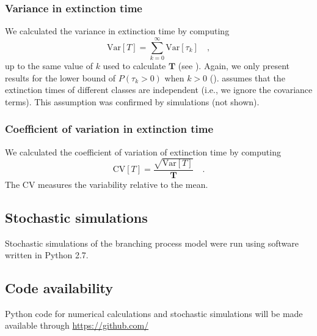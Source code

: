 \documentclass[9pt,lineno]{elife}
\begin{document}
\subsubsection{Variance in extinction time}

We calculated the variance in extinction time by computing 
%
\begin{equation}
    \mathrm{Var}[T] = \sum_{k=0}^\infty \mathrm{Var}[\tau_k] \quad ,
    \label{eq:varT}
\end{equation}
%
up to the same value of $k$ used to calculate $\mathbf{T}$ (see ).  
Again, we only present results for the lower bound of $P(\tau_{k} > 0)$ when $k>0$ ().
 assumes that the extinction times of different classes are independent (i.e., we ignore the covariance terms).  
This assumption was confirmed by simulations (not shown).

\subsubsection{Coefficient of variation in extinction time}

We calculated the coefficient of variation of extinction time by computing 
%
\begin{equation}
    \mathrm{CV}[T] = \frac{\sqrt{\mathrm{Var}[T]}}{\mathbf{T}} \quad . 
    \label{eq:CV}
\end{equation}
%
The CV measures the variability relative to the mean.


\subsection{Stochastic simulations}


Stochastic simulations of the branching process model were run using software written in Python 2.7.


\subsection{Code availability}


Python code for numerical calculations and stochastic simulations will be made available through \url{https://github.com/}



\end{document}
